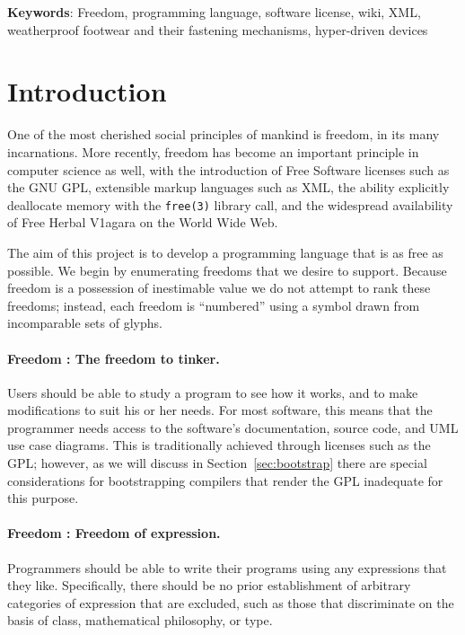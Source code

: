 \documentclass[twocolumn]{article}
\begin{document}
\vspace{1em}
{\noindent \small {\bf Keywords}:
  Freedom, programming language, software license, wiki, XML, 
  weatherproof footwear and their fastening mechanisms,
  hyper-driven devices
}

\section{Introduction}

One of the most cherished social principles of mankind is
freedom,\z{} in its many incarnations. More recently,
freedom has become an important principle in computer science as well,
with the introduction of Free Software licenses such as the GNU
GPL,\z{} extensible markup languages
such as XML,\z{} the ability explicitly deallocate memory
with the {\tt free(3)} library call, and the widespread availability of
Free Herbal V1agara on the World Wide Web.\z{}

The aim of this project is to develop a programming language that is
as free as possible. We begin by enumerating freedoms that we desire
to support. Because freedom is a possession of inestimable
value we do not attempt to rank these freedoms; instead,
each freedom is ``numbered'' using a symbol drawn from incomparable
sets of glyphs.

\paragraph{Freedom \ftinker: The freedom to tinker.}
Users should be able to study a program to see how it works, and to
make modifications to suit his or her needs. For most software, this
means that the programmer needs access to the software's
documentation, source code, and UML
use case diagrams. This is traditionally achieved through licenses
such as the GPL; however, as we will discuss in
Section~\ref{sec:bootstrap} there are special considerations for
bootstrapping compilers that render the GPL inadequate for this
purpose.

\paragraph{Freedom \fexpression: Freedom of expression.}
Programmers should be able to write their programs using any
expressions that they like. Specifically, there should be no
prior establishment of arbitrary categories of expression that
are excluded, such as those that discriminate on the basis
of class, mathematical philosophy, or type.
\end{document}
